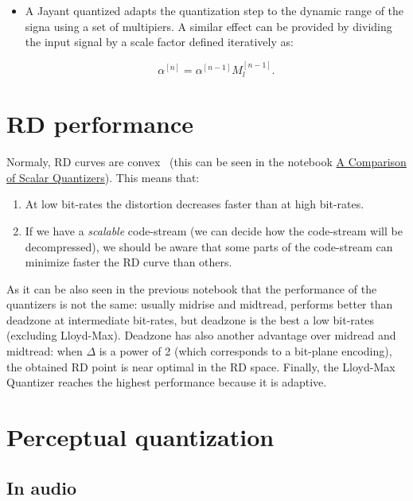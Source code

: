 \begin{itemize}
\item
  A Jayant quantized adapts the quantization step to the dynamic range
  of the signa using a set of multipiers. A similar effect can be
  provided by dividing the input signal by a scale factor defined
  iteratively as:

  \begin{equation}
    \alpha^{[n]} = \alpha^{[n-1]}M_l^{[n-1]}.
  \end{equation}
\end{itemize}


\section{RD performance}

Normaly, RD curves are convex~\cite{vruiz__information_theory} (this
can be seen in the notebook
\href{https://github.com/vicente-gonzalez-ruiz/scalar_quantization/blob/master/docs/SQ_comparison.ipynb}{A
  Comparison of Scalar Quantizers}). This means that:
\begin{enumerate}
\item At low bit-rates the distortion decreases faster than at high
  bit-rates.
\item If we have a \emph{scalable} code-stream (we can decide how the
  code-stream will be decompressed), we should be aware that some
  parts of the code-stream can minimize faster the RD curve than
  others.
\end{enumerate}

As it can be also seen in the previous notebook that the performance
of the quantizers is not the same: usually midrise and midtread,
performs better than deadzone at intermediate bit-rates, but deadzone
is the best a low bit-rates (excluding Lloyd-Max). Deadzone has also
another advantage over midread and midtread: when $\Delta$ is a power
of 2 (which corresponds to a bit-plane encoding), the obtained RD
point is near optimal in the RD space. Finally, the Lloyd-Max
Quantizer reaches the highest performance because it is adaptive.

\section{Perceptual quantization}

\subsection{In audio}

